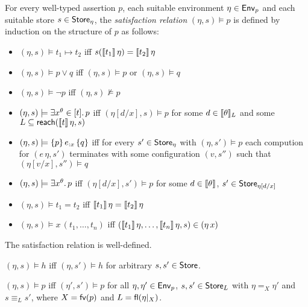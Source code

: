 \documentclass[12pt,a4paper]{report}
\begin{document}
\begin{definition}
  For every well-typed assertion $p$, each suitable environment $\eta \in \mathsf{Env}_p$ and each suitable store
  $s \in \mathsf{Store}_{\eta}$, the {\em satisfaction relation} $(\eta,s) \models p$ is defined by induction
  on the structure of $p$ as follows:
  \begin{itemize}
    \item $(\eta,s) \models t_1 \mapsto t_2$ iff $s(\llbracket t_1\rrbracket\,\eta) = \llbracket t_2\rrbracket\,\eta$
    \item $(\eta,s) \models p \vee q$ iff $(\eta,s) \models p$ or $(\eta,s) \models q$
    \item $(\eta,s) \models \neg p$ iff $(\eta,s) \not\models p$
    \item $(\eta,s) \models \exists{x^\theta}\in{[t]}.\,{p}$ iff $(\eta[d/x],s) \models p$ for some
          $d \in \llbracket\theta\rrbracket_L$ and some $L \subseteq \mathsf{reach}(\llbracket t\rrbracket\,\eta,s)$
    \item $(\eta,s) \models \{p\}\,e_{:x}\,\{q\}$ iff for every $s' \in \mathsf{Store}_{\eta}$ with
          $(\eta,s') \models p$ each compution for $(e\,\eta,s')$ terminates with some
          configuration $(v,s'')$ such that $(\eta[v/x],s'')\models q$
    \item $(\eta,s) \models \exists{x^\theta}.\,{p}$ iff $(\eta[d/x],s') \models p$ for some $d \in \llbracket\theta\rrbracket$,
          $s' \in \mathsf{Store}_{\eta[d/x]}$
    \item $(\eta,s) \models t_1 = t_2$ iff $\llbracket t_1\rrbracket\,\eta = \llbracket t_2\rrbracket\,\eta$
    \item $(\eta,s) \models x\,(t_1,\ldots,t_n)$ iff $(\llbracket t_1\rrbracket\,\eta,\ldots,\llbracket t_n\rrbracket\,\eta,s)\in (\eta\,x)$
  \end{itemize}
\end{definition}

\begin{lemma}
  The satisfaction relation is well-defined.
\end{lemma}

\begin{lemma}
  $(\eta,s) \models h$ iff $(\eta,s') \models h$ for arbitrary $s,s'\in\mathsf{Store}$.
\end{lemma}

\begin{lemma}
  $(\eta,s) \models p$ iff $(\eta',s') \models p$ for all $\eta,\eta'\in\mathsf{Env}_p$, $s,s'\in\mathsf{Store}_L$ with
  $\eta =_{X} \eta'$ and $s \equiv_L s'$, where $X = \mathsf{fv}(p)$ and $L = \mathsf{fl}(\eta|_X)$.
\end{lemma}
\end{document}
